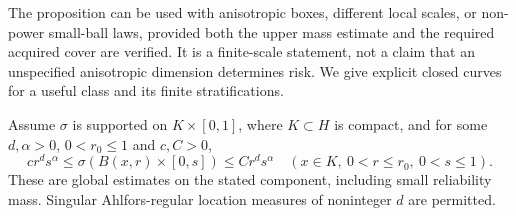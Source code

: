 The proposition can be used with anisotropic boxes, different local scales, or non-power small-ball laws, provided both the upper mass estimate and the required acquired cover are verified. It is a finite-scale statement, not a claim that an unspecified anisotropic dimension determines risk. We give explicit closed curves for a useful class and its finite stratifications.

Assume $\sigma$ is supported on $K\times[0,1]$, where $K\subset H$ is compact, and for some $d,\alpha>0$, $0<r_0\le1$ and $c,C>0$,
\begin{equation}\label{eq:rectangle}
 c r^d s^\alpha\le\sigma(B(x,r)\times[0,s])\le C r^d s^\alpha
 \quad(x\in K,\ 0<r\le r_0,\ 0<s\le1).
\end{equation}
These are global estimates on the stated component, including small reliability mass. Singular Ahlfors-regular location measures of noninteger $d$ are permitted.

